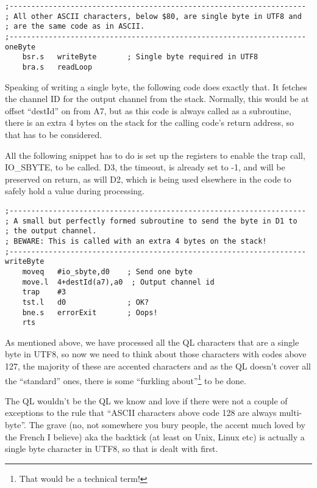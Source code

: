 \begin{lstlisting}
;--------------------------------------------------------------------
; All other ASCII characters, below $80, are single byte in UTF8 and
; are the same code as in ASCII.
;--------------------------------------------------------------------
oneByte     
    bsr.s   writeByte       ; Single byte required in UTF8
    bra.s   readLoop
\end{lstlisting}

Speaking of writing a single byte, the following code does exactly
that. It fetches the channel ID for the output channel from the stack.
Normally, this would be at offset ``destId'' on from A7, but as
this code is always called as a subroutine, there is an extra 4 bytes
on the stack for the calling code's return address, so that has to
be considered.

All the following snippet has to do is set up the registers to enable
the trap call, IO\_SBYTE, to be called. D3, the timeout, is already
set to -1, and will be preserved on return, as will D2, which is being
used elsewhere in the code to safely hold a value during processing.

\begin{lstlisting}
;--------------------------------------------------------------------
; A small but perfectly formed subroutine to send the byte in D1 to
; the output channel.
; BEWARE: This is called with an extra 4 bytes on the stack!
;--------------------------------------------------------------------
writeByte
    moveq   #io_sbyte,d0    ; Send one byte
    move.l  4+destId(a7),a0  ; Output channel id
    trap    #3
    tst.l   d0              ; OK?
    bne.s   errorExit       ; Oops!
    rts
\end{lstlisting}

As mentioned above, we have processed all the QL characters that are
a single byte in UTF8, so now we need to think about those characters
with codes above 127, the majority of these are accented characters
and as the QL doesn't cover all the ``standard'' ones, there is
some ``furkling about''\footnote{That would be a technical term!}
to be done.

The QL wouldn't be the QL we know and love if there were not a couple
of exceptions to the rule that ``ASCII characters above code 128
are always multi-byte''. The grave (no, not somewhere you bury people,
the accent much loved by the French I believe) aka the backtick (at
least on Unix, Linux etc) is actually a single byte character in UTF8,
so that is dealt with first.

